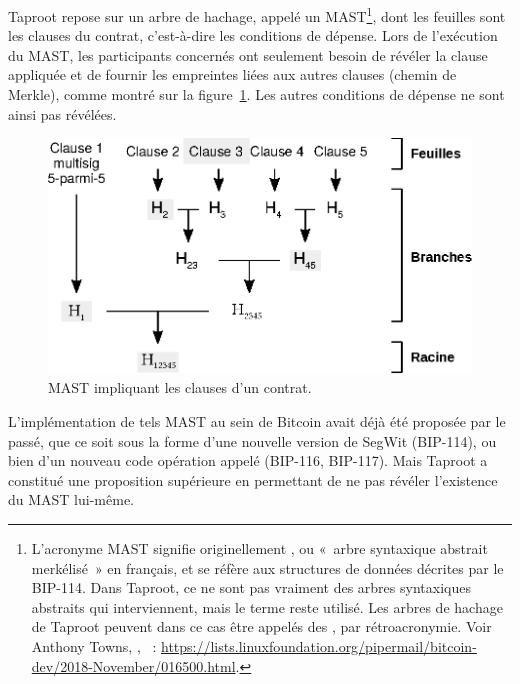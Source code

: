Taproot repose sur un arbre de hachage, appelé un MAST\footnote{L'acronyme MAST signifie originellement , ou «~arbre syntaxique abstrait merkélisé~» en français, et se réfère aux structures de données décrites par le BIP-114. Dans Taproot, ce ne sont pas vraiment des arbres syntaxiques abstraits qui interviennent, mais le terme reste utilisé. Les arbres de hachage de Taproot peuvent dans ce cas être appelés des , par rétroacronymie. Voir Anthony Towns, , ~: \url{https://lists.linuxfoundation.org/pipermail/bitcoin-dev/2018-November/016500.html}.}, dont les feuilles sont les clauses du contrat, c'est-à-dire les conditions de dépense. Lors de l'exécution du MAST, les participants concernés ont seulement besoin de révéler la clause appliquée et de fournir les empreintes liées aux autres clauses (chemin de Merkle), comme montré sur la figure~\ref{fig:taproot-mast}. Les autres conditions de dépense ne sont ainsi pas révélées.

\begin{figure}[h]
  \centering
  \includegraphics[scale=0.75]{img/taproot-mast.eps}
  \caption{MAST impliquant les clauses d'un contrat.}
  \label{fig:taproot-mast}
\end{figure}

L'implémentation de tels MAST au sein de Bitcoin avait déjà été proposée par le passé, que ce soit sous la forme d'une nouvelle version de SegWit (BIP-114), ou bien d'un nouveau code opération appelé  (BIP-116, BIP-117). Mais Taproot a constitué une proposition supérieure en permettant de ne pas révéler l'existence du MAST lui-même.

